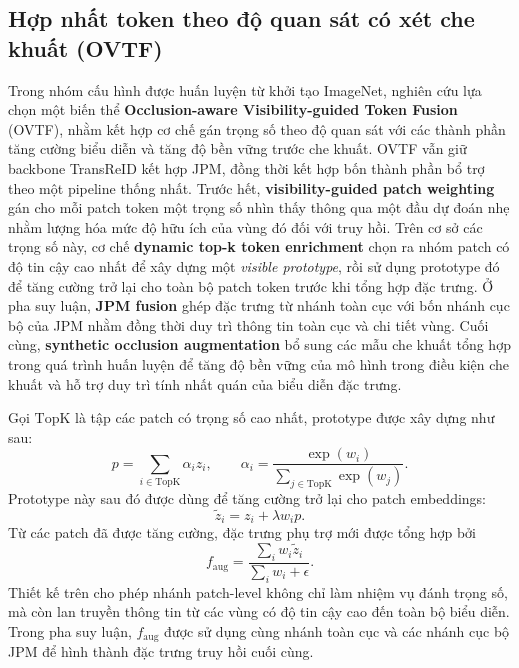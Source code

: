 \subsection{Hợp nhất token theo độ quan sát có xét che khuất (OVTF)}

Trong nhóm cấu hình được huấn luyện từ khởi tạo ImageNet, nghiên cứu lựa chọn
một biến thể \textbf{Occlusion-aware Visibility-guided Token Fusion}
(OVTF), nhằm kết hợp cơ chế
gán trọng số theo độ quan sát với các thành phần tăng cường biểu diễn và tăng
độ bền vững trước che khuất. OVTF vẫn giữ backbone TransReID kết hợp JPM, đồng
thời kết hợp bốn thành phần bổ trợ theo một pipeline thống nhất. Trước hết,
\textbf{visibility-guided patch weighting} gán cho mỗi patch token một trọng số
nhìn thấy thông qua một đầu dự đoán nhẹ nhằm lượng hóa mức độ hữu ích của vùng
đó đối với truy hồi. Trên cơ sở các trọng số này, cơ chế
\textbf{dynamic top-k token enrichment} chọn ra nhóm patch có độ tin cậy cao
nhất để xây dựng một \textit{visible prototype}, rồi sử dụng prototype đó để
tăng cường trở lại cho toàn bộ patch token trước khi tổng hợp đặc trưng. Ở pha
suy luận, \textbf{JPM fusion} ghép đặc trưng từ nhánh toàn cục với bốn nhánh cục
bộ của JPM nhằm đồng thời duy trì thông tin toàn cục và chi tiết vùng. Cuối
cùng, \textbf{synthetic occlusion augmentation} bổ sung các mẫu che khuất tổng
hợp trong quá trình huấn luyện để tăng độ bền vững của mô hình trong điều kiện che khuất
và hỗ trợ duy trì tính nhất quán của biểu diễn đặc trưng.

Gọi \(\mathrm{TopK}\) là tập các patch có trọng số cao nhất, prototype được
xây dựng như sau:
\[
p = \sum_{i \in \mathrm{TopK}} \alpha_i z_i,
\qquad
\alpha_i = \frac{\exp(w_i)}{\sum_{j \in \mathrm{TopK}} \exp(w_j)}.
\]
Prototype này sau đó được dùng để tăng cường trở lại cho patch embeddings:
\[
\tilde{z}_i = z_i + \lambda w_i p.
\]
Từ các patch đã được tăng cường, đặc trưng phụ trợ mới được tổng hợp bởi
\[
f_{\mathrm{aug}} = \frac{\sum_i w_i \tilde{z}_i}{\sum_i w_i + \epsilon}.
\]
Thiết kế trên cho phép nhánh patch-level không chỉ làm nhiệm vụ đánh trọng số,
mà còn lan truyền thông tin từ các vùng có độ tin cậy cao đến toàn bộ biểu
diễn. Trong pha suy luận, \(f_{\mathrm{aug}}\) được sử dụng cùng nhánh toàn cục
và các nhánh cục bộ JPM để hình thành đặc trưng truy hồi cuối cùng.

